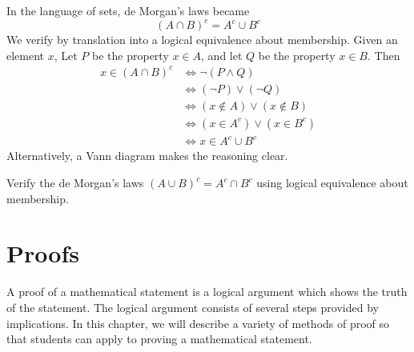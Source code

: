 

In the language of sets, de Morgan's laws became
\[
(A\cap B)^c = A^c \cup B^c\tag{*}
\]
We verify \mybf{*} by translation into a logical equivalence about membership.
Given an element $x$,
Let $P$ be the property $x\in A$, and let $Q$ be the property $x\in B$.
Then
\begin{align*}
x\in (A\cap B)^c & \iff \neg(P\wedge Q)\\
& \iff (\neg P)\vee(\neg Q)\\
& \iff (x\not\in A)\vee(x\not\in B)\\
& \iff (x\in A^c)\vee(x\in B^c)\\
& \iff x\in A^c\cup B^c
\end{align*}
Alternatively, a Vann diagram makes the reasoning clear.


\begin{hw}
Verify the de Morgan's laws $(A\cup B)^c = A^c \cap B^c$ using logical equivalence about membership.
\end{hw}



\section{Proofs}

A proof of a mathematical statement is a logical argument which shows the truth of the statement.
The logical argument consists of several steps provided by implications.
In this chapter, we will describe a variety of methods of proof
so that students can apply to proving a mathematical statement.

